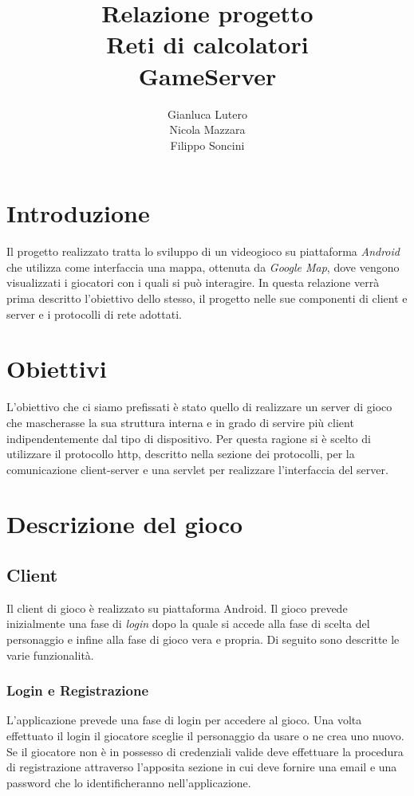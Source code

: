 \documentclass[12pt,a4]{article}
\title{\textbf{Relazione progetto \\ Reti di calcolatori \\ GameServer}}
\author{Gianluca Lutero \\  Nicola Mazzara \\ Filippo Soncini}
\begin{document}
\maketitle

\newpage
\tableofcontents
\newpage

\section*{Introduzione}
Il progetto realizzato tratta lo sviluppo di un videogioco su piattaforma \textit{Android} che utilizza come interfaccia una mappa, ottenuta da \textit{Google Map}, dove vengono visualizzati i giocatori con i quali si può interagire. In questa relazione verrà prima descritto l'obiettivo dello stesso, il progetto nelle sue componenti di client e server e i protocolli di rete adottati.

\section{Obiettivi}
L'obiettivo che ci siamo prefissati è stato quello di realizzare un server di gioco che mascherasse la sua struttura interna e in grado di servire più client indipendentemente dal tipo di dispositivo. Per questa ragione si è scelto di utilizzare il protocollo http, descritto nella sezione dei protocolli, per la comunicazione client-server e una servlet per realizzare l'interfaccia del server. 

\section{Descrizione del gioco}

\subsection{Client}
Il client di gioco è realizzato su piattaforma Android. Il gioco prevede inizialmente una fase di \textit{login} dopo la quale si accede alla fase di scelta del personaggio e infine alla fase di gioco vera e propria. Di seguito sono descritte le varie funzionalità.

\subsubsection{Login e Registrazione}
L'applicazione prevede una fase di login per accedere al gioco. Una volta effettuato il login il giocatore sceglie il personaggio da usare o ne crea uno nuovo. Se il giocatore non è in possesso di credenziali valide deve effettuare la procedura di registrazione attraverso l'apposita sezione in cui deve fornire una email e una password che lo identificheranno nell'applicazione.
\end{document}
